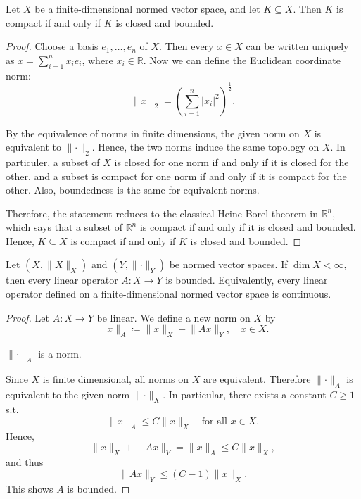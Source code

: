 \begin{corollary}
    Let \(X\) be a finite-dimensional normed vector space, and let \(K \subseteq X\). Then \(K\) is compact if and only if \(K\) is closed and bounded.    
\end{corollary}

\begin{proof}
    Choose a basis \(e_1, \dots , e_n\) of \(X\). Then every \(x \in X\) can be written uniquely as \(x = \sum_{i=1}^n x_i e_i \), where \(x_i \in \mathbb{R}\). Now we can define the Euclidean coordinate norm:
    \[
        \lVert x \rVert_2 = \left( \sum_{i=1}^n \vert x_i \vert^2   \right)^{\frac{1}{2}}. 
    \]

    By the equivalence of norms in finite dimensions, the given norm on \(X\) is equivalent to \(\lVert \cdot \rVert_2 \). Hence, the two norms induce the same topology on \(X\). In particuler, a subset of \(X\) is closed for one norm if and only if it is closed for the other, and a subset is compact for one norm if and only if it is compact for the other. Also, boundedness is the same for equivalent norms. 

    Therefore, the statement reduces to the classical Heine-Borel theorem in \(\mathbb{R} ^n\), which says that a subset of \(\mathbb{R} ^n\) is compact if and only if it is closed and bounded. Hence, \(K \subseteq X\) is compact if and only if \(K\) is closed and bounded.             
\end{proof}

\begin{corollary}
    Let \((X, \lVert X \rVert_X )\) and \((Y, \lVert \cdot \rVert_Y )\) be normed vector spaces. If \(\dim X < \infty\), then every linear operator \(A: X \to Y\) is bounded. Equivalently, every linear operator defined on a finite-dimensional normed vector space is continuous.   
\end{corollary}

\begin{proof}
    Let \(A: X \to Y\) be linear. We define a new norm on \(X\) by 
    \[
        \lVert x \rVert_A \coloneqq \lVert x \rVert_X + \lVert Ax \rVert_Y, \quad x \in X.   
    \]  
    \begin{claim}
        \(\lVert \cdot \rVert_A \) is a norm. 
    \end{claim}

    Since \(X\) is finite dimensional, all norms on \(X\) are equivalent. Therefore \(\lVert \cdot \rVert_A \) is equivalent to the given norm \(\lVert \cdot \rVert_X \). In particular, there exists a constant \(C \ge 1\) s.t. 
    \[
        \lVert x \rVert_A \le C \lVert x \rVert_X \quad \text{for all } x \in X.   
    \]     
    Hence,
    \[
         \lVert x \rVert_X + \lVert Ax \rVert_Y = \lVert x \rVert_A \le C \lVert x \rVert_X,
    \]
    and thus 
    \[
        \lVert Ax \rVert_Y \le (C - 1) \lVert x \rVert_X.  
    \]
    This shows \(A\) is bounded. 
\end{proof}

